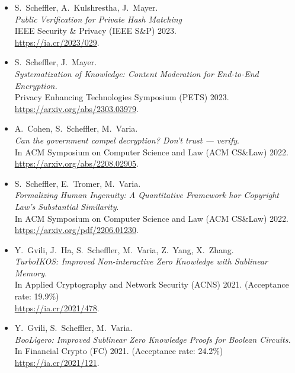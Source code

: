 \documentclass{res}
\begin{document}
\begin{resume}
\begin{itemize}
\item[\csamimprovements] S.~Scheffler, A.~Kulshrestha, J.~Mayer. \\
\emph{Public Verification for Private Hash Matching} \\
IEEE Security \& Privacy (IEEE S\&P) 2023. \\
\url{https://ia.cr/2023/029}.

\item[\eeesok] S.~Scheffler, J.~Mayer. \\
\emph{Systematization of Knowledge: Content Moderation for End-to-End Encryption.} \\
Privacy Enhancing Technologies Symposium (PETS) 2023. \\
\url{https://arxiv.org/abs/2303.03979}.

\item[\foregoneVerif] A.~Cohen, S.~Scheffler, M.~Varia. \\
\emph{Can the government compel decryption?  Don't trust --- verify}. \\
In ACM Symposium on Computer Science and Law (ACM CS\&Law) 2022. \\
\url{https://arxiv.org/abs/2208.02905}.

\item[\copyrightMDL] S.~Scheffler, E.~Tromer, M.~Varia. \\
\emph{Formalizing Human Ingenuity: A Quantitative Framework hor Copyright Law's Substantial Similarity}. \\
In ACM Symposium on Computer Science and Law (ACM CS\&Law) 2022. \\
\url{https://arxiv.org/pdf/2206.01230}.

\item[\turboikos] Y.~Gvili, J.~Ha, S.~Scheffler, M.~Varia, Z.~Yang, X.~Zhang. \\
\emph{TurboIKOS: Improved Non-interactive Zero Knowledge with Sublinear Memory.} \\
In Applied Cryptography and Network Security (ACNS) 2021. (Acceptance rate: 19.9\%) \\
\url{https://ia.cr/2021/478}.

\item[\booligero] Y.~Gvili, S.~Scheffler, M.~Varia. \\
\emph{BooLigero: Improved Sublinear Zero Knowledge Proofs for Boolean Circuits.} \\
In Financial Crypto (FC) 2021.  (Acceptance rate: 24.2\%) \\
\url{https://ia.cr/2021/121}.


\end{itemize}
\end{resume}
\end{document}
